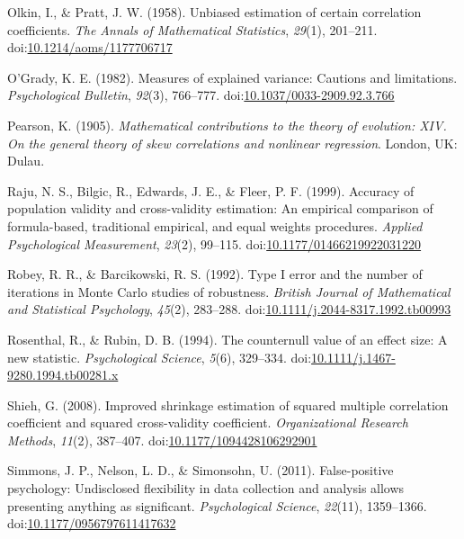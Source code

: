 \documentclass[english,man]{apa6}
\theoremstyle{definition}
\theoremstyle{definition}
\theoremstyle{definition}
\theoremstyle{remark}
\begin{document}
\hypertarget{ref-Olkin1958}{}
Olkin, I., \& Pratt, J. W. (1958). Unbiased estimation of certain
correlation coefficients. \emph{The Annals of Mathematical Statistics},
\emph{29}(1), 201--211.
doi:\href{https://doi.org/10.1214/aoms/1177706717}{10.1214/aoms/1177706717}

\hypertarget{ref-OGrady1982}{}
O'Grady, K. E. (1982). Measures of explained variance: Cautions and
limitations. \emph{Psychological Bulletin}, \emph{92}(3), 766--777.
doi:\href{https://doi.org/10.1037/0033-2909.92.3.766}{10.1037/0033-2909.92.3.766}

\hypertarget{ref-Pearson1905}{}
Pearson, K. (1905). \emph{Mathematical contributions to the theory of
evolution: XIV. On the general theory of skew correlations and nonlinear
regression}. London, UK: Dulau.

\hypertarget{ref-Raju1999}{}
Raju, N. S., Bilgic, R., Edwards, J. E., \& Fleer, P. F. (1999).
Accuracy of population validity and cross-validity estimation: An
empirical comparison of formula-based, traditional empirical, and equal
weights procedures. \emph{Applied Psychological Measurement},
\emph{23}(2), 99--115.
doi:\href{https://doi.org/10.1177/01466219922031220}{10.1177/01466219922031220}

\hypertarget{ref-Robey1992}{}
Robey, R. R., \& Barcikowski, R. S. (1992). Type I error and the number
of iterations in Monte Carlo studies of robustness. \emph{British
Journal of Mathematical and Statistical Psychology}, \emph{45}(2),
283--288.
doi:\href{https://doi.org/10.1111/j.2044-8317.1992.tb00993}{10.1111/j.2044-8317.1992.tb00993}

\hypertarget{ref-Rosenthal1994}{}
Rosenthal, R., \& Rubin, D. B. (1994). The counternull value of an
effect size: A new statistic. \emph{Psychological Science}, \emph{5}(6),
329--334.
doi:\href{https://doi.org/10.1111/j.1467-9280.1994.tb00281.x}{10.1111/j.1467-9280.1994.tb00281.x}

\hypertarget{ref-Shieh2008}{}
Shieh, G. (2008). Improved shrinkage estimation of squared multiple
correlation coefficient and squared cross-validity coefficient.
\emph{Organizational Research Methods}, \emph{11}(2), 387--407.
doi:\href{https://doi.org/10.1177/1094428106292901}{10.1177/1094428106292901}

\hypertarget{ref-Simmons2011}{}
Simmons, J. P., Nelson, L. D., \& Simonsohn, U. (2011). False-positive
psychology: Undisclosed flexibility in data collection and analysis
allows presenting anything as significant. \emph{Psychological Science},
\emph{22}(11), 1359--1366.
doi:\href{https://doi.org/10.1177/0956797611417632}{10.1177/0956797611417632}
\end{document}
